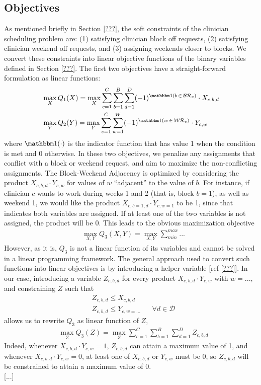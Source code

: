 \subsection{Objectives}
As mentioned briefly in Section \ref{???}, the soft constraints of the clinician scheduling problem are: (1) satisfying clinician block off requests, (2) satisfying clinician weekend off requests, and (3) assigning weekends closer to blocks. We convert these constraints into linear objective functions of the binary variables defined in Section \ref{???}. The first two objectives have a straight-forward formulation as linear functions:
\begin{align}
	&\max_X Q_1(X) = \max_X \sum_{c=1}^{C} \sum_{b=1}^{B} \sum_{d=1}^{D} (-1)^{\ind(b\,\in\,\mathcal{BR}_c)}\cdot X_{c, b, d} \\
	&\max_Y Q_2(Y) = \max_Y \sum_{c=1}^{C} \sum_{w=1}^{W} (-1)^{\ind(w\,\in\,\mathcal{WR}_c)}\cdot Y_{c, w}
\end{align}
where $\ind(\cdot)$ is the indicator function that has value 1 when the condition is met and 0 otherwise. In these two objectives, we penalize any assignments that conflict with a block or weekend request, and aim to maximize the non-conflicting assignments. The Block-Weekend Adjacency is optimized by considering the product $X_{c, b, d}\cdot Y_{c, w}$ for values of $w$ ``adjacent'' to the value of $b$. For instance, if clinician $c$ wants to work during weeks 1 and 2 (that is, block $b = 1$), as well as weekend 1, we would like the product $X_{c, b=1, d} \cdot Y_{c, w=1}$ to be 1, since that indicates both variables are assigned. If at least one of the two variables is not assigned, the product will be 0. This leads to the obvious maximization objective
\begin{align}
	&\max_{X, Y} Q_3(X, Y) = \max_{X, Y} \sum_{min}^{max} ...
\end{align}
However, as it is, $Q_3$ is not a linear function of its variables and cannot be solved in a linear programming framework. The general approach used to convert such functions into linear objectives is by introducing a helper variable [ref \ref{???}]. In our case, introducing a variable $Z_{c, b, d}$ for every product $X_{c, b, d} \cdot Y_{c, w}$ with $w = ...$, and constraining $Z$ such that 
\begin{align}
	&Z_{c, b, d} \leq X_{c, b, d} \\
	&Z_{c, b, d} \leq Y_{c, w=...} &&\forall d\in\mathcal{D}
\end{align}
allows us to rewrite $Q_3$ as linear function of $Z$,
\begin{align*}
	&\max_{Z} Q_3(Z) = \max_{Z} \sum_{c=1}^{C} \sum_{b=1}^{B} \sum_{d=1}^{D} Z_{c, b, d}
\end{align*}
Indeed, whenever $X_{c, b, d} \cdot Y_{c, w} = 1$, $Z_{c, b, d}$ can attain a maximum value of 1, and whenever $X_{c, b, d} \cdot Y_{c, w} = 0$, at least one of $X_{c, b, d}$ or $Y_{c, w}$ must be 0, so $Z_{c, b, d}$ will be constrained to attain a maximum value of 0. \\

[...]